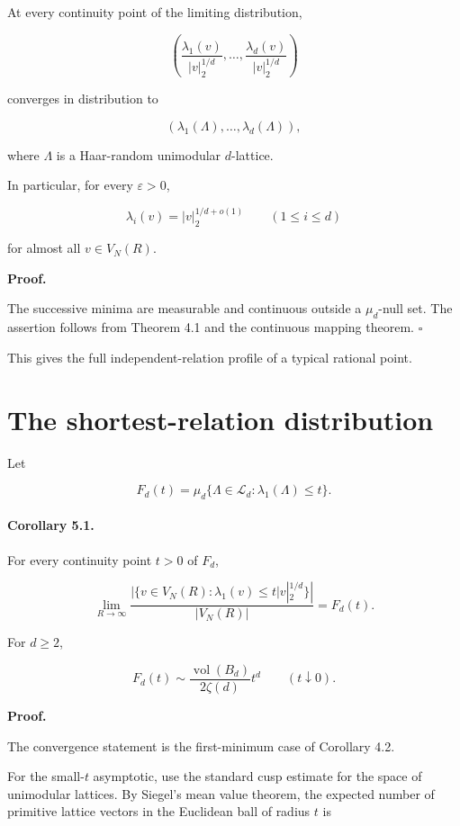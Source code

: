 \documentclass[11pt]{article}
\begin{document}
At every continuity point of the limiting distribution,

\[
\left(
\frac{\lambda_1(v)}{|v|_2^{1/d}},
\dots,
\frac{\lambda_d(v)}{|v|_2^{1/d}}
\right)
\]

converges in distribution to

\[
\left(
\lambda_1(\Lambda),
\dots,
\lambda_d(\Lambda)
\right),
\]

where $\Lambda$ is a Haar-random unimodular $d$-lattice.

In particular, for every $\varepsilon>0$,

\[
\lambda_i(v)=|v|_2^{1/d+o(1)}
\qquad
(1\le i\le d)
\]

for almost all $v\in V_N(R)$.

\noindent\textbf{Proof.}

The successive minima are measurable and continuous outside a $\mu_d$-null set. The assertion follows from Theorem 4.1 and the continuous mapping theorem. $\square$

This gives the full independent-relation profile of a typical rational point.

\section{The shortest-relation distribution}

Let

\[
F_d(t)=\mu_d\{\Lambda\in\mathscr L_d:\lambda_1(\Lambda)\le t\}.
\]

\paragraph{Corollary 5.1.}

For every continuity point $t>0$ of $F_d$,

\[
\lim_{R\to\infty}
\frac{
|\{v\in V_N(R):\lambda_1(v)\le t|v|_2^{1/d}\}|
}{
|V_N(R)|
}
=F_d(t).
\]

For $d\ge2$,

\[
F_d(t)\sim \frac{\operatorname{vol}(B_d)}{2\zeta(d)}t^d
\qquad(t\downarrow0).
\]

\noindent\textbf{Proof.}

The convergence statement is the first-minimum case of Corollary 4.2.

For the small-$t$ asymptotic, use the standard cusp estimate for the space of unimodular lattices. By Siegel's mean value theorem, the expected number of primitive lattice vectors in the Euclidean ball of radius $t$ is
\end{document}
